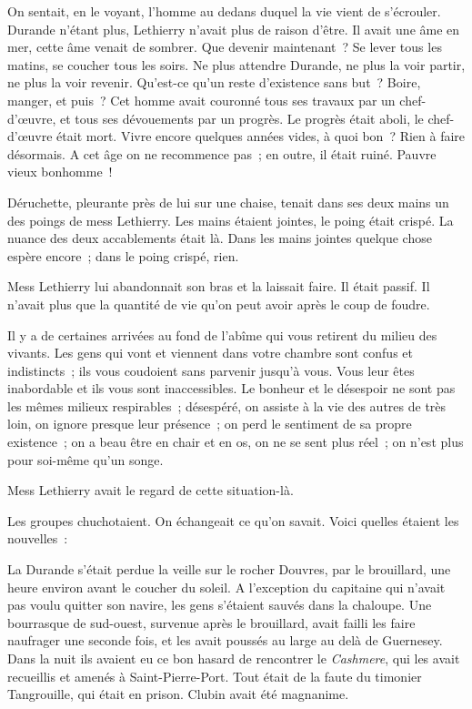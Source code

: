 \documentclass[french,twoside]{book} %
\begin{document}
On sentait, en le voyant, l’homme au dedans duquel la vie vient de s’écrouler. Durande n’étant plus, Lethierry n’avait plus de raison d’être. Il avait une âme en mer, cette âme venait de sombrer. Que devenir  maintenant ? Se lever tous les matins, se coucher tous les soirs. Ne plus attendre Durande, ne plus la voir partir, ne plus la voir revenir. Qu’est-ce qu’un reste d’existence sans but ? Boire, manger, et puis ? Cet homme avait couronné tous ses travaux par un chef-d’œuvre, et tous ses dévouements par un progrès. Le progrès était aboli, le chef-d’œuvre était mort. Vivre encore quelques années vides, à quoi bon ? Rien à faire désormais. A cet âge on ne recommence pas ; en outre, il était ruiné. Pauvre vieux bonhomme !\par
Déruchette, pleurante près de lui sur une chaise, tenait dans ses deux mains un des poings de mess Lethierry. Les mains étaient jointes, le poing était crispé. La nuance des deux accablements était là. Dans les mains jointes quelque chose espère encore ; dans le poing crispé, rien.\par
Mess Lethierry lui abandonnait son bras et la laissait faire. Il était passif. Il n’avait plus que la quantité de vie qu’on peut avoir après le coup de foudre.\par
Il y a de certaines arrivées au fond de l’abîme qui vous retirent du milieu des vivants. Les gens qui vont et viennent dans votre chambre sont confus et indistincts ; ils vous coudoient sans parvenir jusqu’à vous. Vous leur êtes inabordable et ils vous sont inaccessibles. Le bonheur et le désespoir ne sont pas les mêmes milieux respirables ; désespéré, on assiste à la vie des autres de très loin, on ignore presque leur présence ; on perd le sentiment de sa propre existence ; on a beau être en chair et en os, on ne se sent plus réel ; on n’est plus pour soi-même qu’un songe.\par
 Mess Lethierry avait le regard de cette situation-là.\par
Les groupes chuchotaient. On échangeait ce qu’on savait. Voici quelles étaient les nouvelles :\par
La Durande s’était perdue la veille sur le rocher Douvres, par le brouillard, une heure environ avant le coucher du soleil. A l’exception du capitaine qui n’avait pas voulu quitter son navire, les gens s’étaient sauvés dans la chaloupe. Une bourrasque de sud-ouest, survenue après le brouillard, avait failli les faire naufrager une seconde fois, et les avait poussés au large au delà de Guernesey. Dans la nuit ils avaient eu ce bon hasard de rencontrer le \emph{Cashmere}, qui les avait recueillis et amenés à Saint-Pierre-Port. Tout était de la faute du timonier Tangrouille, qui était en prison. Clubin avait été magnanime.\par
\end{document}
